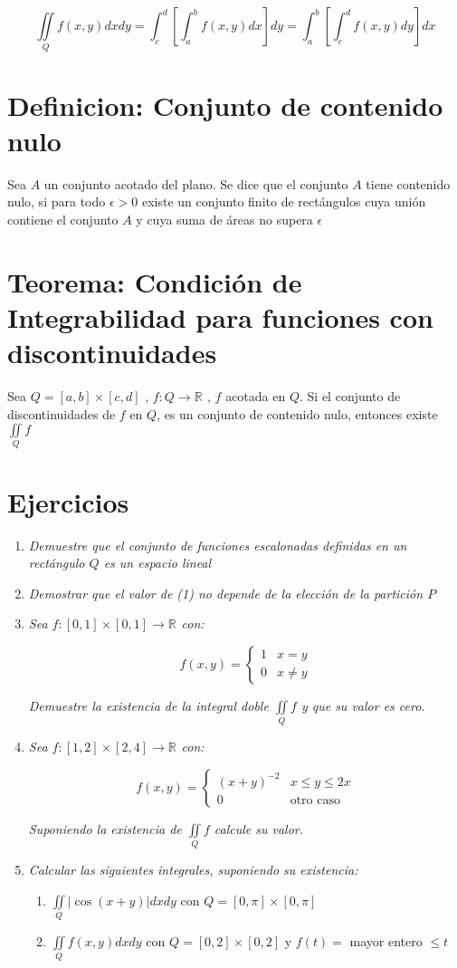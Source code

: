 \documentclass[12pt]{article}
\newcommand{\teorema}[1]{\section{Teorema: #1}}
\newcommand{\definicion}[1]{\section{Definicion: #1}}
\newcommand{\ejercicios}{\section{Ejercicios}}
\newcommand{\R}[1]{\mathbb{R}^{#1}}
\begin{document}
	\begin{equation}
		\iint\limits_Q f(x,y)dxdy = \int_{c}^{d} \left[ \int_{a}^{b} f(x,y)dx \right]dy = \int_{a}^{b} \left[ \int_{c}^{d} f(x,y)dy \right]dx
	\end{equation}
	
	\definicion{Conjunto de contenido nulo}
	
	Sea $A$ un conjunto acotado del plano. Se dice que el conjunto $A$ tiene contenido nulo, si para todo $\epsilon > 0$ existe un conjunto finito de rectángulos cuya unión contiene el conjunto $A$ y cuya suma de áreas no supera $\epsilon$
	
	\teorema{Condición de Integrabilidad para funciones con discontinuidades}
	
	Sea $Q = [a,b]\times[c,d]$ , $f:Q \rightarrow \R{}$ , $f$ acotada en $Q$. Si el conjunto de discontinuidades de $f$ en $Q$, es un conjunto de contenido nulo, entonces existe $\iint\limits_Q f$
	
	\ejercicios
	
	\begin{enumerate}
		\item \textit{Demuestre que el conjunto de funciones escalonadas definidas en un rectángulo $Q$ es un espacio lineal}
		\item \textit{Demostrar que el valor de (1) no depende de la elección de la partición $P$}
		\item \textit{Sea $f:[0,1]\times[0,1] \rightarrow \R{}$ con:}
		
		$$ f(x,y) = \begin{cases}
			1 & x=y \\
			0 & x \neq y
		\end{cases} $$
	
		\textit{Demuestre la existencia de la integral doble $\iint\limits_Q f$ y que su valor es cero.}
		
		\item \textit{Sea $f:[1,2]\times[2,4] \rightarrow \R{}$ con:}
		
		$$ f(x,y) = \begin{cases}
			(x+y)^{-2} & x \leq y \leq 2x \\
			0 & \text{otro caso}
		\end{cases} $$
	
		\textit{Suponiendo la existencia de $\iint\limits_Q f$ calcule su valor.}
		
		\item \textit{Calcular las siguientes integrales, suponiendo su existencia:}
		
		\begin{enumerate}
			\item $\iint\limits_Q |\cos (x+y)|dxdy$ con $Q = [0,\pi]\times[0,\pi]$
			\item $\iint\limits_Q f(x,y) dxdy$ con $Q = [0,2]\times[0,2]$ y $f(t) = $ mayor entero $\leq t$
		\end{enumerate}
		
	\end{enumerate}
	
\end{document}
